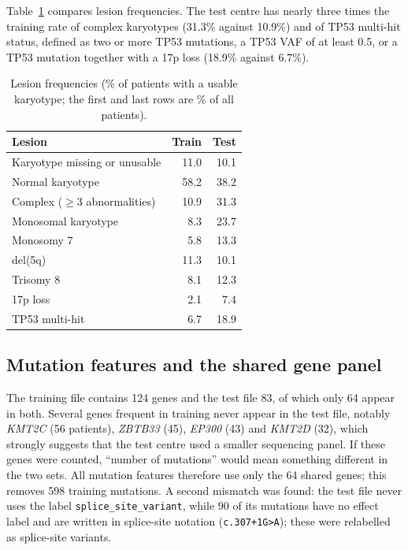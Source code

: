 \documentclass[11pt,a4paper]{article}
\begin{document}
Table~\ref{tab:lesions} compares lesion frequencies. The test centre has nearly three times
the training rate of complex karyotypes (31.3\% against 10.9\%) and of TP53 multi-hit
status, defined as two or more TP53 mutations, a TP53 VAF of at least 0.5, or a TP53
mutation together with a 17p loss (18.9\% against 6.7\%).

\begin{table}[H]
\centering
\caption{Lesion frequencies (\% of patients with a usable karyotype; the first and last
rows are \% of all patients).}
\label{tab:lesions}
\begin{tabular}{lrr}
\toprule
Lesion & Train & Test \\
\midrule
Karyotype missing or unusable & 11.0 & 10.1 \\
Normal karyotype              & 58.2 & 38.2 \\
Complex ($\ge 3$ abnormalities) & 10.9 & 31.3 \\
Monosomal karyotype           & 8.3  & 23.7 \\
Monosomy 7                    & 5.8  & 13.3 \\
del(5q)                       & 11.3 & 10.1 \\
Trisomy 8                     & 8.1  & 12.3 \\
17p loss                      & 2.1  & 7.4 \\
TP53 multi-hit                & 6.7  & 18.9 \\
\bottomrule
\end{tabular}
\end{table}

\subsection{Mutation features and the shared gene panel}
The training file contains 124 genes and the test file 83, of which only 64 appear in
both. Several genes frequent in training never appear in the test file, notably
\textit{KMT2C} (56 patients), \textit{ZBTB33} (45), \textit{EP300} (43) and
\textit{KMT2D} (32), which strongly suggests that the test centre used a smaller
sequencing panel. If these genes were counted, ``number of mutations'' would mean
something different in the two sets. All mutation features therefore use only the 64
shared genes; this removes 598 training mutations. A second mismatch was found: the test
file never uses the label \texttt{splice\_site\_variant}, while 90 of its mutations have no
effect label and are written in splice-site notation (\texttt{c.307+1G>A}); these were
relabelled as splice-site variants.
\end{document}
